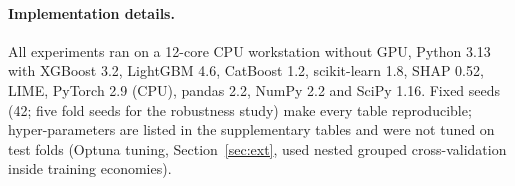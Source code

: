\paragraph{Implementation details.} All experiments ran on a 12-core CPU workstation without GPU, Python 3.13 with XGBoost 3.2, LightGBM 4.6, CatBoost 1.2, scikit-learn 1.8, SHAP 0.52, LIME, PyTorch 2.9 (CPU), pandas 2.2, NumPy 2.2 and SciPy 1.16. Fixed seeds (42; five fold seeds for the robustness study) make every table reproducible; hyper-parameters are listed in the supplementary tables and were not tuned on test folds (Optuna tuning, Section~\ref{sec:ext}, used nested grouped cross-validation inside training economies).
